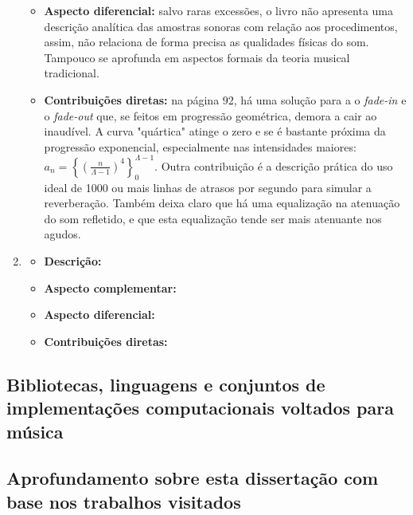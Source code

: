 \begin{enumerate}
\begin{itemize}
            \item {\bf Aspecto diferencial:} salvo raras excessões, o livro não apresenta uma descrição analítica das amostras sonoras com relação aos procedimentos, assim, não relaciona de forma precisa as qualidades físicas do som. Tampouco se aprofunda em aspectos formais da teoria musical tradicional.
            \item {\bf Contribuições diretas:} na página 92, há uma solução para a o \emph{fade-in} e o \emph{fade-out} que, se feitos em progressão geométrica, demora a cair ao inaudível. A curva "quártica" atinge o zero e se é bastante próxima da progressão exponencial, especialmente nas intensidades maiores: $a_n = \left\{\left(\frac{n}{\Lambda-1}\right)^4\right\}_0^{\Lambda-1}$. Outra contribuição é a descrição prática do uso ideal de 1000 ou mais linhas de atrasos por segundo para simular a reverberação. Também deixa claro que há uma equalização na atenuação do som refletido, e que esta equalização tende ser mais atenuante nos agudos.
        \end{itemize}
    \item \emph{}
        \begin{itemize}
            \item {\bf Descrição:}
            \item {\bf Aspecto complementar:}
            \item {\bf Aspecto diferencial:}
            \item {\bf Contribuições diretas:}
        \end{itemize}
\end{enumerate}

\subsection{Bibliotecas, linguagens e conjuntos de implementações computacionais voltados para música}

\subsection{Aprofundamento sobre esta dissertação com base nos trabalhos visitados}



